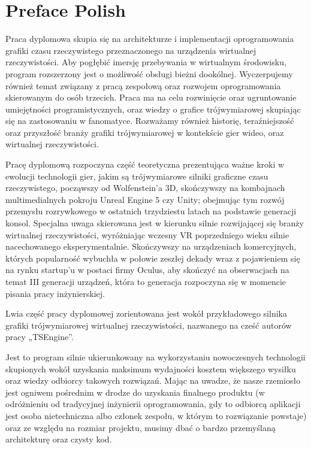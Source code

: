 \newpage
\section{Preface Polish}
Praca dyplomowa skupia się na architekturze i implementacji oprogramowania grafiki czasu rzeczywistego przeznaczonego na urządzenia wirtualnej rzeczywistości. Aby pogłębić imersję przebywania w wirtualnym środowisku, program rozszerzony jest o możliwość obsługi bieżni dookólnej. Wyczerpujemy również temat związany z pracą zespołową oraz rozwojem oprogramowania skierowanym do osób trzecich. Praca ma na celu rozwinięcie oraz ugruntowanie umiejętności programistycznych, oraz wiedzy o grafice trójwymiarowej skupiając się na zastosowaniu w fanomatyce. Rozważamy również historię, teraźniejszość oraz przyszłość branży grafiki trójwymiarowej w kontekście gier wideo, oraz wirtualnej rzeczywistości. 

Pracę dyplomową rozpoczyna część teoretyczna prezentująca ważne kroki w ewolucji technologii gier, jakim są trójwymiarowe silniki graficzne czasu rzeczywistego, począwszy od Wolfenstein’a 3D, skończywszy na kombajnach multimedialnych pokroju Unreal Engine 5 czy Unity; obejmując tym rozwój przemysłu rozrywkowego w ostatnich trzydziestu latach na podstawie generacji konsol. Specjalna uwaga skierowana jest w kierunku silnie rozwijającej się branży wirtualnej rzeczywistości, wyróżniając wczesny VR poprzedniego wieku silnie nacechowanego eksperymentalnie. Skończywszy na urządzeniach komercyjnych, których popularność wybuchła w połowie zeszłej dekady wraz z pojawieniem się na rynku startup’u w postaci firmy Oculus, aby skończyć na obserwacjach na temat III generacji urządzeń, która to generacja rozpoczyna się w momencie pisania pracy inżynierskiej. 
 

Lwia część pracy dyplomowej zorientowana jest wokół przykładowego silnika grafiki trójwymiarowej wirtualnej rzeczywistości, nazwanego na cześć autorów pracy „TSEngine”. 

Jest to program silnie ukierunkowany na wykorzystaniu nowoczesnych technologii skupionych wokół uzyskania maksimum wydajności kosztem większego wysiłku oraz wiedzy odbiorcy takowych rozwiązań. Mając na uwadze, że nasze rzemiosło jest ogniwem pośrednim w drodze do uzyskania finalnego produktu (w odróżnieniu od tradycyjnej inżynierii oprogramowania, gdy to odbiorcą aplikacji jest osoba nietechniczna albo członek zespołu, w którym to rozwiązanie powstaje) oraz ze względu na rozmiar projektu, musimy dbać o bardzo przemyślaną architekturę oraz czysty kod. 
 

